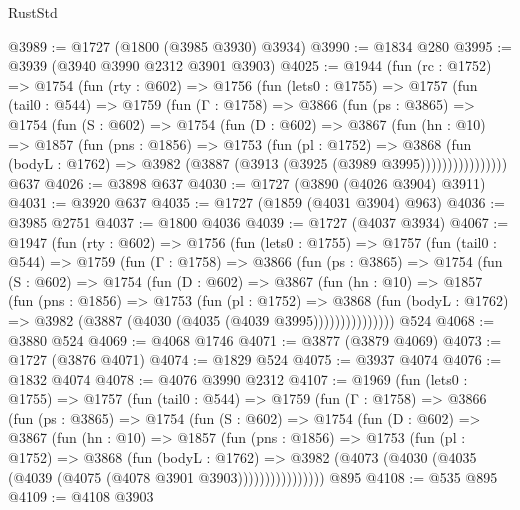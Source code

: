 \begin{lexlean}{RustStd}
\begin{coremodule}
@3989 := @1727 (@1800 (@3985 @3930) @3934)
@3990 := @1834 @280
@3995 := @3939 (@3940 @3990 @2312 @3901 @3903)
@4025 := @1944
    (fun (rc : @1752) =>
    @1754
      (fun (rty : @602) =>
      @1756
        (fun (lets0 : @1755) =>
        @1757
          (fun (tail0 : @544) =>
          @1759
            (fun (Γ : @1758) =>
            @3866
              (fun (ps : @3865) =>
              @1754
                (fun (S : @602) =>
                @1754
                  (fun (D : @602) =>
                  @3867
                    (fun (hn : @10) =>
                    @1857
                      (fun (pns : @1856) =>
                      @1753
                        (fun (pl : @1752) =>
                        @3868
                          (fun (bodyL : @1762) =>
                          @3982 (@3887 (@3913 (@3925 (@3989 @3995))))))))))))))))
    @637
@4026 := @3898 @637
@4030 := @1727 (@3890 (@4026 @3904) @3911)
@4031 := @3920 @637
@4035 := @1727 (@1859 (@4031 @3904) @963)
@4036 := @3985 @2751
@4037 := @1800 @4036
@4039 := @1727 (@4037 @3934)
@4067 := @1947
    (fun (rty : @602) =>
    @1756
      (fun (lets0 : @1755) =>
      @1757
        (fun (tail0 : @544) =>
        @1759
          (fun (Γ : @1758) =>
          @3866
            (fun (ps : @3865) =>
            @1754
              (fun (S : @602) =>
              @1754
                (fun (D : @602) =>
                @3867
                  (fun (hn : @10) =>
                  @1857
                    (fun (pns : @1856) =>
                    @1753
                      (fun (pl : @1752) =>
                      @3868
                        (fun (bodyL : @1762) =>
                        @3982 (@3887 (@4030 (@4035 (@4039 @3995)))))))))))))))
    @524
@4068 := @3880 @524
@4069 := @4068 @1746
@4071 := @3877 (@3879 @4069)
@4073 := @1727 (@3876 @4071)
@4074 := @1829 @524
@4075 := @3937 @4074
@4076 := @1832 @4074
@4078 := @4076 @3990 @2312
@4107 := @1969
    (fun (lets0 : @1755) =>
    @1757
      (fun (tail0 : @544) =>
      @1759
        (fun (Γ : @1758) =>
        @3866
          (fun (ps : @3865) =>
          @1754
            (fun (S : @602) =>
            @1754
              (fun (D : @602) =>
              @3867
                (fun (hn : @10) =>
                @1857
                  (fun (pns : @1856) =>
                  @1753
                    (fun (pl : @1752) =>
                    @3868
                      (fun (bodyL : @1762) =>
                      @3982 (@4073 (@4030 (@4035 (@4039 (@4075 (@4078 @3901 @3903))))))))))))))))
    @895
@4108 := @535 @895
@4109 := @4108 @3903

\end{coremodule}
\end{lexlean}
